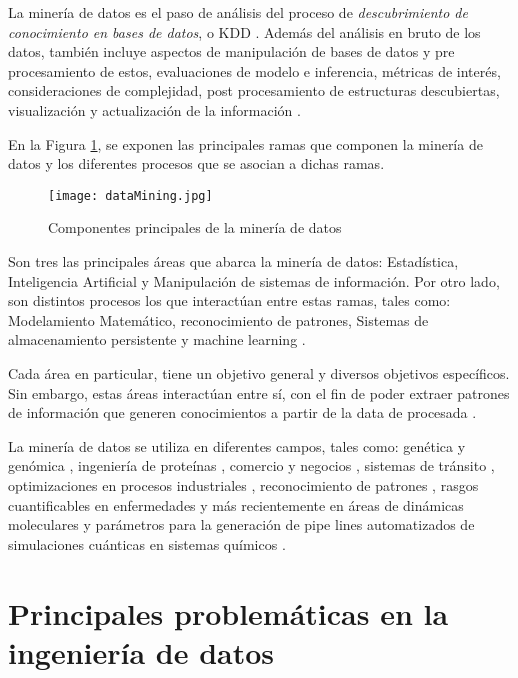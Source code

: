La minería de datos es el paso de análisis del proceso de \textit{descubrimiento de conocimiento en bases de datos}, o KDD \cite{fayyad1996kdd}. Además del análisis en bruto de los datos, también incluye aspectos de manipulación de bases de datos y pre procesamiento de estos, evaluaciones de modelo e inferencia, métricas de interés, consideraciones de complejidad, post procesamiento de estructuras descubiertas, visualización y actualización de la información \cite{berry2004data}.

En la Figura \ref{intro1}, se exponen las principales ramas que componen la minería de datos y los diferentes procesos que se asocian a dichas ramas.

\begin{figure}[!h]
	
	\centering
	\texttt{[image: dataMining.jpg]}
	\caption{Componentes principales de la minería de datos}
	\label{intro1}
\end{figure}

Son tres las principales áreas que abarca la minería de datos: Estadística, Inteligencia Artificial y Manipulación de sistemas de información. Por otro lado, son distintos procesos los que interactúan entre estas ramas, tales como: Modelamiento Matemático, reconocimiento de patrones, Sistemas de almacenamiento persistente y machine learning \cite{hand2006data}.

Cada área en particular, tiene un objetivo general y diversos objetivos específicos. Sin embargo, estas áreas interactúan entre sí, con el fin de poder extraer patrones de información que generen conocimientos a partir de la data de procesada \cite{berry2004data}.

La minería de datos se utiliza en diferentes campos, tales como: genética y genómica \cite{Lee2008, Rebhan1998}, ingeniería de proteínas \cite{han2009research, 4548625, li2008fast}, comercio y negocios \cite{hofmann2013rapidminer}, sistemas de tránsito \cite{Ma2013}, optimizaciones en procesos industriales \cite{Chien2008, 8051033, 983448}, reconocimiento de patrones \cite{jain1988algorithms, fayyad1996data}, rasgos cuantificables en enfermedades \cite{Yoo2012, obenshain2004, LDuan} y más recientemente en áreas de dinámicas moleculares \cite{Chen2017, Yang:2005:GFM:1081870.1081962} y parámetros para la generación de pipe lines automatizados de simulaciones cuánticas en sistemas químicos \cite{MAO2004787, PhysRevLett.91.135503, Ramakrishnan2015}.


\section{Principales problemáticas en la ingeniería de datos}

